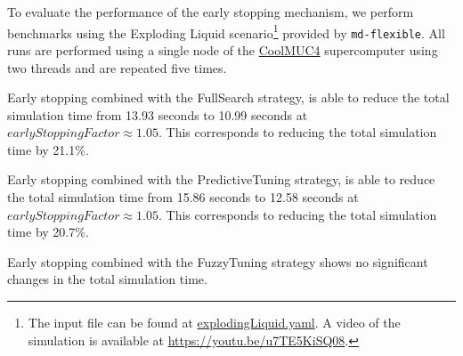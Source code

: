 \documentclass[conference]{IEEEtran}
\begin{document}
To evaluate the performance of the early stopping mechanism, we perform benchmarks using the Exploding Liquid scenario\footnote{
    The input file can be found at \href{
        https://github.com/AutoPas/AutoPas/blob/master/examples/md-flexible/input/explodingLiquid.yaml}{explodingLiquid.yaml}.
    A video of the simulation is available at \url{https://youtu.be/u7TE5KiSQ08}.
} provided by \texttt{md-flexible}. All runs are performed using a single node of the \href{https://doku.lrz.de/coolmuc-4-1082337877.html}{CoolMUC4} supercomputer using two threads and are repeated five times.

\begin{description}[style=nextline]
    \item[FullSearch (\autoref{fig:full_search})]
        Early stopping combined with the FullSearch strategy, is able to reduce the total simulation time from 13.93 seconds to 10.99 seconds at $earlyStoppingFactor \approx1.05$. This corresponds to reducing the total simulation time by 21.1\%.
    \item[PredictiveTuning (\autoref{fig:predictive_tuning})]
        Early stopping combined with the PredictiveTuning strategy, is able to reduce the total simulation time from 15.86 seconds to 12.58 seconds at $earlyStoppingFactor \approx1.05$. This corresponds to reducing the total simulation time by 20.7\%.
    \item[FuzzyTuning (\autoref{fig:fuzzy_tuning})]
        Early stopping combined with the FuzzyTuning strategy shows no significant changes in the total simulation time.
\end{description}
\end{document}
